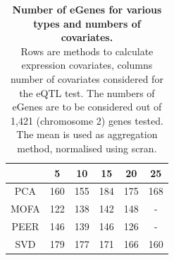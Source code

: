 \begin{table}[h]
    \centering
    \begin{tabular}{c|c c c c c}
    &       5 & 10 & 15 & 20 & 25  \\
    \hline
    PCA   & 160 & 155 &  184 & 175 & 168 \\
    MOFA  & 122 & 138 &  142 & 148 & -   \\
    PEER  & 146 & 139 &  146 & 126 & -   \\
    SVD   & 179 & 177 &  171 & 166 & 160 \\
    \end{tabular}
    \caption[Number and type of covariate comparison]{\textbf{Number of eGenes for various types and numbers of covariates.}\\
    Rows are methods to calculate expression covariates, columns number of covariates considered for the eQTL test.
    The numbers of eGenes are to be considered out of 1,421 (chromosome 2) genes tested.
    The mean is used as aggregation method, normalised using scran.}
    \label{tab:covariates}
\end{table}




